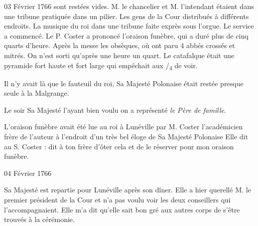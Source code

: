 \begin{diary}{03 Février 1766}{}
                           sont restées vides. M. le
                              chancelier et M. l'intendant
                           étaient dans une tribune
                           pratiquée dans un pilier. Les gens de la
                           Cour distribués à différents endroits. La
                              musique du roi dans une tribune faite
                           exprès sous l'orgue. Le service a commencé.
                           Le P. Coster a prononcé l'oraison
                           funèbre, qui
                           a duré plus de cinq quarts d'heure. Après la
                           messe les obsèques, où ont paru 4 abbés
                           crossés et mitrés. On n'est sorti qu'après
                           une heure un quart. Le catafalque était
                           une pyramide fort haute et fort large
                           qui empêchait aux /\textsubscript{4}
                           de voir. \bigskip


                         Il n'y avait là que le fauteuil du
                           roi,
                           Sa Majesté Polonaise était restée presque seule à
                           la Malgrange. \bigskip


                         Le soir Sa Majesté l'ayant bien voulu on a
                           représenté \emph{le Père de famille}. \bigskip


                         L'oraison funèbre avait été
                           lue au roi à
                           Lunéville par M. Coster l'académicien frère
                           de l'auteur à l'endroit d'un très bel éloge
                           de Sa Majesté Polonaise Elle dit au S.
                              Coster : \og dit à
                              ton frère d'ôter cela et de le réserver pour
                              mon oraison funèbre. \fg{}
                        \bigskip


                     \end{diary}

                     \begin{diary}{04 Février 1766}{}


                           Sa Majesté est repartie pour Lunéville après
                           son dîner. Elle a hier querellé M. le
                              premier
                              président de la Cour et n'a pas voulu voir les deux conseillers qui
                           l'accompagnaient.
                           Elle m'a dit qu'elle sait bon gré aux
                           autres corps de s'être trouvés à la cérémonie. \bigskip


                     \end{diary}

